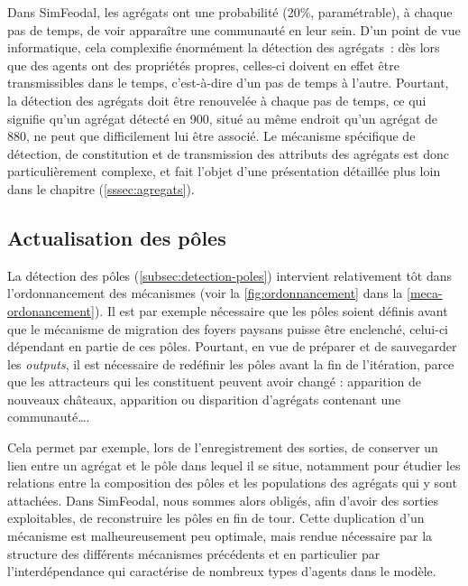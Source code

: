 \begin{tcolorbox}[breakable,left=0pt,right=0pt,top=0pt,bottom=0pt,
	colback=gray!15,colframe=gray!15,width=\dimexpr\textwidth\relax, 
	enlarge left by=0mm, boxsep=5pt,arc=0pt,outer arc=0pt]
	
Dans SimFeodal, les agrégats ont une probabilité (20\%, paramétrable), à chaque pas de temps, de voir apparaître une communauté en leur sein.
D'un point de vue informatique, cela complexifie énormément la détection des agrégats :
	dès lors que des agents ont des propriétés propres, celles-ci doivent en effet être transmissibles dans le temps, c'est-à-dire d'un pas de temps à l'autre.
Pourtant, la détection des agrégats doit être renouvelée à chaque pas de temps, ce qui signifie qu'un agrégat détecté en 900, situé au même endroit qu'un agrégat de 880, ne peut que difficilement lui être associé\footnotemark.
Le mécanisme spécifique de détection, de constitution et de transmission des attributs des agrégats est donc particulièrement complexe, et fait l'objet d'une présentation détaillée plus loin dans le chapitre (\cref{sssec:agregats}).
\end{tcolorbox}

\subsection{Actualisation des pôles}

\begin{tcolorbox}[breakable,left=0pt,right=0pt,top=0pt,bottom=0pt,
	colback=gray!15,colframe=gray!15,width=\dimexpr\textwidth\relax, 
	enlarge left by=0mm, boxsep=5pt,arc=0pt,outer arc=0pt]

La détection des pôles (\cref{subsec:detection-poles}) intervient relativement tôt dans l'ordonnancement des mécanismes (voir la \cref{fig:ordonnancement} dans la \cref{meca-ordonancement}).
Il est par exemple nécessaire que les pôles soient définis avant que le mécanisme de migration des foyers paysans puisse être enclenché, celui-ci dépendant en partie de ces pôles.
Pourtant, en vue de préparer et de sauvegarder les \textit{outputs}, il est nécessaire de redéfinir les pôles avant la fin de l'itération, parce que les attracteurs qui les constituent peuvent avoir changé :
	apparition de nouveaux châteaux, apparition ou disparition d'agrégats contenant une communauté\ldots.

\medskip
Cela permet par exemple, lors de l'enregistrement des sorties, de conserver un lien entre un agrégat et le pôle dans lequel il se situe, notamment pour étudier les relations entre la composition des pôles et les populations des agrégats qui y sont attachées.
Dans SimFeodal, nous sommes alors obligés, afin d'avoir des sorties exploitables, de reconstruire les pôles en fin de tour.
Cette duplication d'un mécanisme est malheureusement peu optimale, mais rendue nécessaire par la structure des différents mécanismes précédents et en particulier par l'interdépendance qui caractérise de nombreux types d'agents dans le modèle.
\end{tcolorbox}


